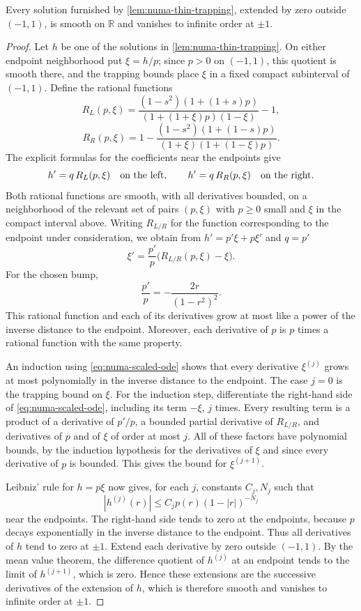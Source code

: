 \begin{lemma}\label{lem:numa-thin-flat-extension}
Every solution furnished by \cref{lem:numa-thin-trapping}, extended by zero outside $(-1,1)$, is smooth on $\mathbb R$ and vanishes to infinite order at $\pm1$.
\end{lemma}
\begin{proof}
Let $h$ be one of the solutions in \cref{lem:numa-thin-trapping}. On either endpoint neighborhood put $\xi=h/p$; since $p>0$ on $(-1,1)$, this quotient is smooth there, and the trapping bounds place $\xi$ in a fixed compact subinterval of $(-1,1)$. Define the rational functions
\[
 R_L(p,\xi)=
 \frac{(1-s^2)(1+(1+s)p)}{(1+(1+\xi)p)(1-\xi)}-1,
\]
\[
 R_R(p,\xi)=1-
 \frac{(1-s^2)(1+(1-s)p)}{(1+\xi)(1+(1-\xi)p)}.
\]
The explicit formulas for the coefficients near the endpoints give
\[
 h'=q\,R_L(p,\xi)\quad\hbox{on the left},\qquad
 h'=q\,R_R(p,\xi)\quad\hbox{on the right}.
\]
Both rational functions are smooth, with all derivatives bounded, on a neighborhood of the relevant set of pairs $(p,\xi)$ with $p\geq0$ small and $\xi$ in the compact interval above. Writing $R_{L/R}$ for the function corresponding to the endpoint under consideration, we obtain from $h'=p'\xi+p\xi'$ and $q=p'$
\begin{equation}\label{eq:numa-scaled-ode}
 \xi'=\frac{p'}p\bigl(R_{L/R}(p,\xi)-\xi\bigr).
\end{equation}
For the chosen bump,
\[
 \frac{p'}p=-\frac{2r}{(1-r^2)^2}.
\]
This rational function and each of its derivatives grow at most like a power of the inverse distance to the endpoint. Moreover, each derivative of $p$ is $p$ times a rational function with the same property.

An induction using \eqref{eq:numa-scaled-ode} shows that every derivative $\xi^{(j)}$ grows at most polynomially in the inverse distance to the endpoint. The case $j=0$ is the trapping bound on $\xi$. For the induction step, differentiate the right-hand side of \eqref{eq:numa-scaled-ode}, including its term $-\xi$, $j$ times. Every resulting term is a product of a derivative of $p'/p$, a bounded partial derivative of $R_{L/R}$, and derivatives of $p$ and of $\xi$ of order at most $j$. All of these factors have polynomial bounds, by the induction hypothesis for the derivatives of $\xi$ and since every derivative of $p$ is bounded. This gives the bound for $\xi^{(j+1)}$.

Leibniz' rule for $h=p\xi$ now gives, for each $j$, constants $C_j,N_j$ such that
\[
 |h^{(j)}(r)|\leq C_j p(r)(1-|r|)^{-N_j}
\]
near the endpoints. The right-hand side tends to zero at the endpoints, because $p$ decays exponentially in the inverse distance to the endpoint. Thus all derivatives of $h$ tend to zero at $\pm1$. Extend each derivative by zero outside $(-1,1)$. By the mean value theorem, the difference quotient of $h^{(j)}$ at an endpoint tends to the limit of $h^{(j+1)}$, which is zero. Hence these extensions are the successive derivatives of the extension of $h$, which is therefore smooth and vanishes to infinite order at $\pm1$.
\end{proof}

